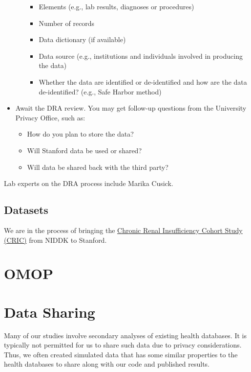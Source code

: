 \documentclass[
]{book}
\providecommand{\tightlist}{%
  \setlength{\itemsep}{0pt}\setlength{\parskip}{0pt}}
\begin{document}
\begin{itemize}
\begin{itemize}
    \begin{itemize}
    \tightlist
    \item
      Elements (e.g., lab results, diagnoses or procedures)
    \item
      Number of records
    \item
      Data dictionary (if available)
    \item
      Data source (e.g., institutions and individuals involved in producing the data)
    \item
      Whether the data are identified or de-identified and how are the data de-identified? (e.g., Safe Harbor method)
    \end{itemize}
  \end{itemize}
\item
  Await the DRA review. You may get follow-up questions from the University Privacy Office, such as:

  \begin{itemize}
  \tightlist
  \item
    How do you plan to store the data?
  \item
    Will Stanford data be used or shared?
  \item
    Will data be shared back with the third party?
  \end{itemize}
\end{itemize}

Lab experts on the DRA process include Marika Cusick.

\hypertarget{datasets}{%
\subsection{Datasets}\label{datasets}}

We are in the process of bringing the \href{https://repository.niddk.nih.gov/studies/cric/}{Chronic Renal Insufficiency Cohort Study (CRIC)} from NIDDK to Stanford.

\hypertarget{omop}{%
\section{OMOP}\label{omop}}

\hypertarget{data-sharing}{%
\section{Data Sharing}\label{data-sharing}}

Many of our studies involve secondary analyses of existing health databases. It is typically not permitted for us to share such data due to privacy considerations. Thus, we often created simulated data that has some similar properties to the health databases to share along with our code and published results.
\end{document}
